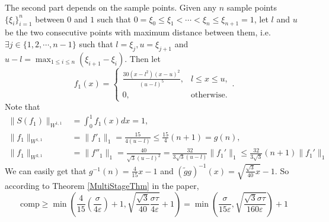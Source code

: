 The second part depends on the sample points. Given any $n$ sample points $\{\xi_i\}_{i=1}^{n}$ between $0$ and $1$ such that $0=\xi_0\leq \xi_1<\cdots<\xi_n\leq \xi_{n+1}=1$, let $l$ and $u$ be the two consecutive points with maximum distance between them, i.e. $\exists j\in \{1,2,\cdots,n-1\}$ such that $l=\xi_j, u=\xi_{j+1}$ and $u-l=\max_{1\leq i\leq n}(\xi_{i+1}-\xi_i)$. Then let
$$f_1(x)=\begin{cases}  \displaystyle  \frac{30(x-l^2)(x-u)^2}{(u-l)^5}, & l\leq x\leq u,\\[2ex]
 \displaystyle  0, & \text{otherwise}.
\end{cases}.$$
Note that
\begin{align*}
    \|S(f_1)\|_{W^{1,1}}&=\int_{0}^{1}f_1(x)dx=1,\\
    \|f_1\|_{W^{1,1}}&=\|f'_{1}\|_1=\frac{15}{4(u-l)}\leq \frac{15}{4}(n+1)=g(n),\\
    \|f_1\|_{W^{2,1}}&=\|f''_{1}\|_1=\frac{40}{\sqrt{3}(u-l)^2}=\frac{32}{3\sqrt{3}(u-l)}\|f_1'\|_1\leq \frac{32}{3\sqrt{3}}(n+1)\|f_1'\|_1%
\end{align*}
We can easily get that $g^{-1}(n)=\frac{4}{15}x-1$ and $(\tilde{g}g)^{-1}(x)=\sqrt{\frac{\sqrt{3}}{40}x}-1$. So according to Theorem \ref{MultiStageThm} in the paper, $$\text{comp}\geq \min\left(\frac{4}{15}(\frac{\sigma}{4\varepsilon})+1,\sqrt{\frac{\sqrt{3}}{40}\frac{\sigma\tau}{4\varepsilon}}+1\right)=\min\left(\frac{\sigma}{15\varepsilon},\sqrt{\frac{\sqrt{3}\sigma\tau}{160\varepsilon}}\right)+1$$

%


